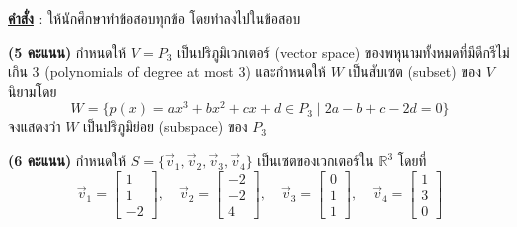 ﻿\documentclass[12pt, a4paper]{exam}
\begin{document}
\sloppy
\setcounter{page}{2}

\noindent \textbf{\underline{คำสั่ง}} : ให้นักศึกษาทำข้อสอบทุกข้อ โดยทำลงไปในข้อสอบ
\vspace{0.5cm}

\begin{questions}

\question \textbf{(5 คะแนน)} กำหนดให้ $V = P_3$ เป็น\mbox{ปริภูมิ\mbox{เวกเตอร์}} (vector space) ของพหุนามทั้งหมดที่มีดีกรีไม่เกิน 3 (polynomials of degree at most 3) และกำหนดให้ $W$ เป็นสับเซต (subset) ของ $V$ นิยามโดย
\[
W = \{p(x) = ax^3 + bx^2 + cx + d \in P_3 \mid 2a - b + c - 2d = 0\}
\]
จงแสดงว่า $W$ เป็นปริภูมิย่อย (subspace) ของ $P_3$
\newpage

\question \textbf{(6 คะแนน)} กำหนดให้ $S = \{\vec{v}_1, \vec{v}_2, \vec{v}_3, \vec{v}_4\}$ เป็นเซตของ\mbox{เวกเตอร์}ใน $\mathbb{R}^3$ โดยที่
\[
\vec{v}_1 = \begin{bmatrix} 1 \\ 1 \\ -2 \end{bmatrix}, \quad
\vec{v}_2 = \begin{bmatrix} -2 \\ -2 \\ 4 \end{bmatrix}, \quad
\vec{v}_3 = \begin{bmatrix} 0 \\ 1 \\ 1 \end{bmatrix}, \quad
\vec{v}_4 = \begin{bmatrix} 1 \\ 3 \\ 0 \end{bmatrix}
\]
\newpage


\end{questions}
\end{document}
